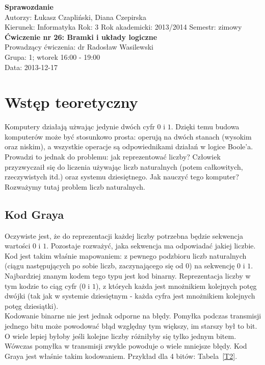 \documentclass[12pt]{mwart}
\begin{document}
\begin{centering}
  {\Large \textbf{Sprawozdanie}}\\
  Autorzy: Łukasz Czapliński, Diana Czepirska \\ 
  Kierunek: Informatyka Rok: 3 Rok akademicki: 2013/2014 Semestr: zimowy
  {\large \textbf{Ćwiczenie nr 26:  Bramki i układy logiczne}}\\
  Prowadzący ćwiczenia: dr Radosław Wasilewski \\
  Grupa: 1; wtorek 16:00 - 19:00 \\
  Data: 2013-12-17 \\
\end{centering}
\section{Wstęp teoretyczny}
Komputery działają użwając jedynie dwóch cyfr $0$ i $1$. Dzięki temu budowa komputerów może być stosunkowo prosta: operują na dwóch stanach (wysokim oraz niskim), a wszystkie operacje są odpowiednikami działań w logice Boole'a.\\
Prowadzi to jednak do problemu: jak reprezentować liczby? Człowiek przyzwyczaił się do liczenia używając liczb naturalnych (potem całkowitych, rzeczywistych itd.) oraz systemu dziesiętnego. Jak nauczyć tego komputer? Rozważymy tutaj problem liczb naturalnych.
\subsection{Kod Graya}
Oczywiste jest, że do reprezentacji każdej liczby potrzebna będzie sekwencja wartości $0$ i $1$. Pozostaje rozważyć, jaka sekwencja ma odpowiadać jakiej liczbie. Kod jest takim właśnie mapowaniem: z pewnego podzbioru liczb naturalnych (ciągu następujących po sobie liczb, zaczynającego się od 0) na sekwencję $0$ i $1$.\\
Najbardziej znanym kodem tego typu jest kod binarny. Reprezentacja liczby w tym kodzie to ciąg cyfr ($0$ i $1$), z których każda jest mnożnikiem kolejnych potęg dwójki (tak jak w systemie dziesiętnym - każda cyfra jest mnożnikiem kolejnych potęg dziesiątki).\\
Kodowanie binarne nie jest jednak odporne na błędy. Pomyłka podczas transmisji jednego bitu może powodować błąd względny tym większy, im starszy był to bit. O wiele lepiej byłoby jeśli kolejne liczby różniłyby się tylko jednym bitem. Wówczas pomyłka w transmisji zwykle powoduje o wiele mniejsze błędy. Kod Graya jest właśnie takim kodowaniem. Przykład dla 4 bitów: Tabela~\ref{T2}.
\end{document}
